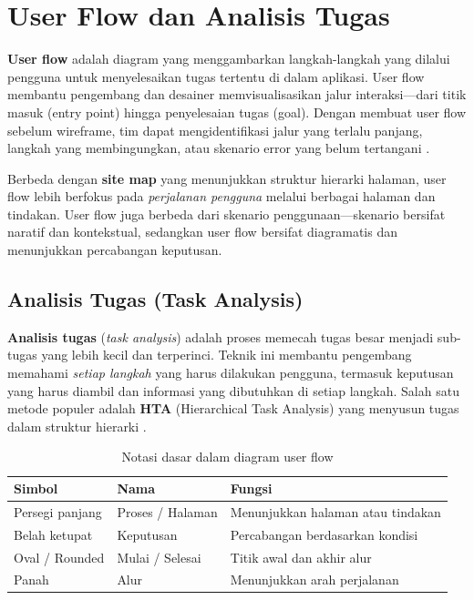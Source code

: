 ﻿\section{User Flow dan Analisis Tugas}

\textbf{User flow} adalah diagram yang menggambarkan langkah-langkah yang dilalui pengguna untuk menyelesaikan tugas tertentu di dalam aplikasi. User flow membantu pengembang dan desainer memvisualisasikan jalur interaksi---dari titik masuk (entry point) hingga penyelesaian tugas (goal). Dengan membuat user flow sebelum wireframe, tim dapat mengidentifikasi jalur yang terlalu panjang, langkah yang membingungkan, atau skenario error yang belum tertangani \cite{mdnLearn}.

Berbeda dengan \textbf{site map} yang menunjukkan struktur hierarki halaman, user flow lebih berfokus pada \textit{perjalanan pengguna} melalui berbagai halaman dan tindakan. User flow juga berbeda dari skenario penggunaan---skenario bersifat naratif dan kontekstual, sedangkan user flow bersifat diagramatis dan menunjukkan percabangan keputusan.

\subsection{Analisis Tugas (Task Analysis)}

\textbf{Analisis tugas} (\textit{task analysis}) adalah proses memecah tugas besar menjadi sub-tugas yang lebih kecil dan terperinci. Teknik ini membantu pengembang memahami \textit{setiap langkah} yang harus dilakukan pengguna, termasuk keputusan yang harus diambil dan informasi yang dibutuhkan di setiap langkah. Salah satu metode populer adalah \textbf{HTA} (Hierarchical Task Analysis) yang menyusun tugas dalam struktur hierarki \cite{nngroup}.

\begin{table}[H]
\centering
\begin{tabular}{|P{2.5cm}|P{4.5cm}|P{5cm}|}
\hline
\textbf{Simbol} & \textbf{Nama} & \textbf{Fungsi} \\
\hline
Persegi panjang & Proses / Halaman & Menunjukkan halaman atau tindakan \\
\hline
Belah ketupat & Keputusan & Percabangan berdasarkan kondisi \\
\hline
Oval / Rounded & Mulai / Selesai & Titik awal dan akhir alur \\
\hline
Panah & Alur & Menunjukkan arah perjalanan \\
\hline
\end{tabular}
\caption{Notasi dasar dalam diagram user flow}
\end{table}

